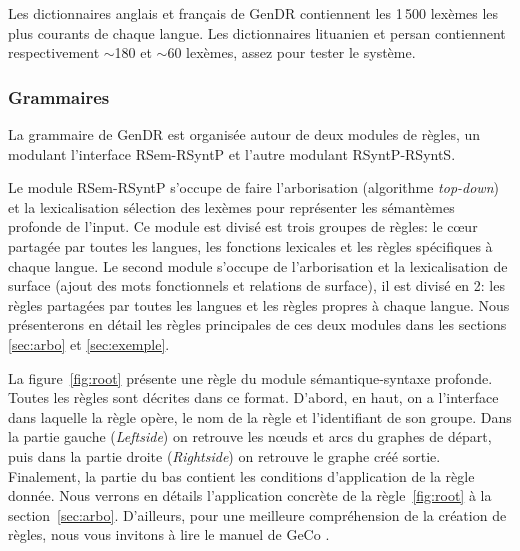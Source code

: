 Les dictionnaires anglais et français de GenDR contiennent les 1\,500 lexèmes les plus courants de chaque langue. Les dictionnaires lituanien \citep{dubinskaite17} et persan contiennent respectivement $\sim$180 et $\sim$60 lexèmes, assez pour tester le système.


\subsubsection{Grammaires}

La grammaire de GenDR est organisée autour de deux modules de règles, un modulant l'interface \ac{RSem}-\ac{RSyntP} et l'autre modulant \ac{RSyntP}-\ac{RSyntS}. 

Le module \ac{RSem}-\ac{RSyntP} s'occupe de faire l'arborisation (algorithme \emph{top-down}) et la lexicalisation {sélection des lexèmes pour représenter les sémantèmes} profonde de l'input. Ce module est divisé est trois groupes de règles: le c\oe{}ur partagée par toutes les langues, les fonctions lexicales et les règles spécifiques à chaque langue. Le second module s'occupe de l'arborisation et la lexicalisation de surface (ajout des mots fonctionnels et relations de surface), il est divisé en 2: les règles partagées par toutes les langues et les règles propres à chaque langue. Nous présenterons en détail les règles principales de ces deux modules dans les sections \ref{sec:arbo} et \ref{sec:exemple}. 

La figure~\ref{fig:root} présente une règle du module sémantique-syntaxe profonde. Toutes les règles sont décrites dans ce format. D'abord, en haut, on a l'interface dans laquelle la règle opère, le nom de la règle et l'identifiant de son groupe. Dans la partie gauche (\emph{Leftside}) on retrouve les n\oe{}uds et arcs du graphes de départ, puis dans la partie droite (\emph{Rightside}) on retrouve le graphe créé sortie. Finalement, la partie du bas contient les conditions d'application de la règle donnée. Nous verrons en détails l'application concrète de la règle~\ref{fig:root} à la section~\ref{sec:arbo}. D'ailleurs, pour une meilleure compréhension de la création de règles, nous vous invitons à lire le manuel de GeCo \citep{LambreyGECOv1User}.

